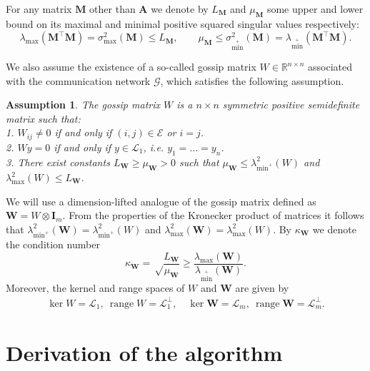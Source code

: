 \documentclass{article}
\newtheorem{assumption}{Assumption}
\DeclareMathOperator{\range}{\mathrm{range}}
\newcommand{\lmax}{\lambda_{\max}}
\newcommand{\smax}{\sigma_{\max}}
\newcommand{\sminp}{\sigma_{\min^+}}
\newcommand{\lminp}{\lambda_{\min^+}}
\newcommand{\R}{\mathbb{R}}
\newcommand{\cG}{\mathcal{G}}
\newcommand{\cE}{\mathcal{E}}
\newcommand{\cL}{\mathcal{L}}
\newcommand{\mA}{\mathbf{A}}
\newcommand{\mW}{\mathbf{W}}
\newcommand{\mI}{\mathbf{I}}
\newcommand{\mM}{\mathbf{M}}
\begin{document}
For any matrix $\mM$ other than $\mA$ we denote by $L_\mM$ and $\mu_\mM$ some upper and lower bound on its maximal and minimal positive squared singular values respectively: 
\begin{equation}\label{eq:mat_Lmu}
  \lmax(\mM^\top\mM) = \smax^2(\mM) \leq L_{\mM},
    \qquad
	\mu_{\mM} \leq \sminp^2(\mM) = \lminp(\mM^\top \mM).
\end{equation}


We also assume the existence of a so-called gossip matrix $W \in \R^{n\times n}$ associated with the communication network $\cG$, which satisfies the following assumption.
\begin{assumption}\label{ass:W}
    The gossip matrix $W$ is a $n\times n$ symmetric positive semidefinite matrix such that:\\
    \hspace*{1em} 1. $W_{ij}\neq 0$ if and only if $(i, j)\in\cE$ or $i = j$.\\
    \hspace*{1em} 2. $Wy = 0$ if and only if $y\in\cL_1$, i.e. $y_1 = \ldots = y_n$.\\
    \hspace*{1em} 3. There exist constants $L_\mW\geq \mu_\mW > 0$ such that $\mu_\mW\leq \lminp^2(W)$ and $\lmax^2(W)\leq L_\mW$.
\end{assumption}
We will use a dimension-lifted analogue of the gossip matrix defined as $\mW = W \otimes \mI_m$.
From the properties of the Kronecker product of matrices it follows that $\lminp^2(\mW) = \lminp^2(W)$ and $\lmax^2(\mW) = \lmax^2(W)$. By $\kappa_{\mW}$ we denote the condition number
\begin{equation}\label{eq:kappa_mW}
   \kappa_{\mW} =  \sqrt\frac{L_{\mW}}{\mu_{\mW}} \geq \frac{\lmax(\mW)}{\lminp(\mW)}.
\end{equation}
Moreover, the kernel and range spaces of $W$ and $\mW$ are given by
\begin{align}
	\label{eq:range_W}
  \ker W = \cL_1, \ \range W = \cL_1^\perp, \quad \ker \mW = \cL_m, \ \range \mW = \cL_m^\perp.
\end{align}


\section{Derivation of the algorithm}\label{sec:derivation_of_algorithm}
\end{document}

